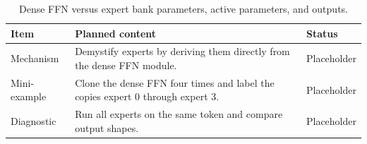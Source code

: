 \begin{table}[H]
\centering
\caption{Dense FFN versus expert bank parameters, active parameters, and outputs.}
\label{tab:ch03-expert-mlps-as-named-ffns}
\begin{tabularx}{\textwidth}{p{}X p{}}
\toprule
Item & Planned content & Status \\
\midrule
Mechanism & Demystify experts by deriving them directly from the dense FFN module. & Placeholder \\
Mini-example & Clone the dense FFN four times and label the copies expert 0 through expert 3. & Placeholder \\
Diagnostic & Run all experts on the same token and compare output shapes. & Placeholder \\
\bottomrule
\end{tabularx}
\end{table}

